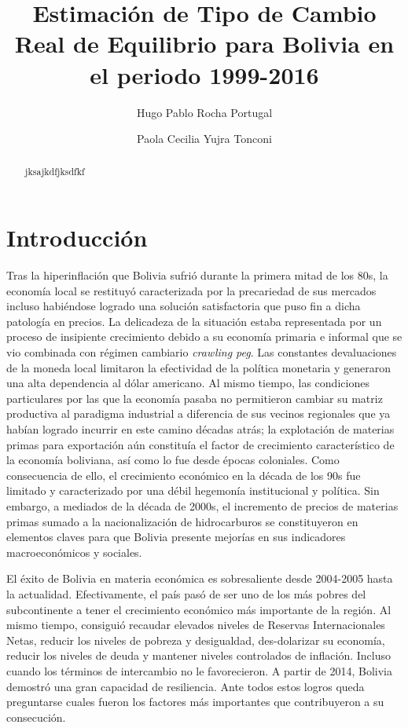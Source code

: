 \documentclass[12pt,letterpaper]{article}
\title{Estimación de Tipo de Cambio Real de Equilibrio para Bolivia en el periodo 1999-2016}
\author{Hugo Pablo Rocha Portugal \and Paola Cecilia Yujra Tonconi}
\date{}
\begin{document}
 

\maketitle 

\begin{abstract}
jksajkdfjksdfkf
\end{abstract}

\newpage

\section{Introducción}

Tras la hiperinflación que Bolivia sufrió durante la primera mitad de los 80s, la economía local se restituyó caracterizada por la precariedad de sus mercados incluso habiéndose logrado una solución satisfactoria que puso fin a dicha patología en precios. La delicadeza de la situación estaba representada por un proceso de insipiente crecimiento debido a su economía primaria e informal que se vio combinada con régimen cambiario \emph{crawling peg}. Las constantes devaluaciones de la moneda local limitaron la efectividad de la política monetaria y generaron una alta dependencia al dólar americano. Al mismo tiempo, las condiciones particulares por las que la economía pasaba no permitieron cambiar su matriz productiva al paradigma industrial a diferencia de sus vecinos regionales que ya habían logrado incurrir en este camino décadas atrás; la explotación de materias primas para exportación aún constituía el factor de crecimiento característico de la economía boliviana, así como lo fue desde épocas coloniales. Como consecuencia de ello, el crecimiento económico en la década de los 90s fue limitado y caracterizado por una débil hegemonía institucional y política. Sin embargo, a mediados de la década de 2000s, el incremento de precios de materias primas sumado a la nacionalización de hidrocarburos se constituyeron en elementos claves para que Bolivia presente mejorías en sus indicadores macroeconómicos y sociales.

El éxito de Bolivia en materia económica es sobresaliente desde 2004-2005 hasta la actualidad. Efectivamente, el país pasó de ser uno de los más pobres del subcontinente a tener el crecimiento económico más importante de la región. Al mismo tiempo, consiguió recaudar elevados niveles de Reservas Internacionales Netas, reducir los niveles de pobreza y desigualdad, des-dolarizar su economía, reducir los niveles de deuda y mantener niveles controlados de inflación. Incluso cuando los términos de intercambio no le favorecieron. A partir de 2014, Bolivia demostró una gran capacidad de resiliencia. Ante todos estos logros queda preguntarse cuales fueron los factores más importantes que contribuyeron a su consecución.
\end{document}
